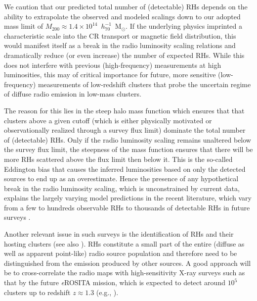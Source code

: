 \documentclass[useAMS,usenatbib]{mn2e}
\begin{document}
We caution that our predicted total number of (detectable) RHs depends on the
ability to extrapolate the observed and modeled scalings down to our adopted
mass limit of $M_{200}\approx1.4\times10^{14}$~$h_{70}^{-1}$~M$_{\odot}$. If the
underlying physics imprinted a characteristic scale into the CR transport or
magnetic field distribution, this would manifest itself as a break in the radio
luminosity scaling relations and dramatically reduce (or even increase) the
number of expected RHs.  While this does not interfere with previous
(high-frequency) measurements at high luminosities, this may of critical
importance for future, more sensitive (low-frequency) measurements of
low-redshift clusters that probe the uncertain regime of diffuse radio emission
in low-mass clusters.

The reason for this lies in the steep halo mass function which ensures that that
clusters above a given cutoff (which is either physically motivated or
observationally realized through a survey flux limit) dominate the total number
of (detectable) RHs. Only if the radio luminosity scaling remains unaltered
below the survey flux limit, the steepness of the mass function ensures that
there will be more RHs scattered above the flux limit then below it. This is the
so-called Eddington bias that causes the inferred luminosities based on only the
detected sources to end up as an overestimate. Hence the presence of any
hypothetical break in the radio luminosity scaling, which is unconstrained by
current data, explains the largely varying model predictions in the recent
literature, which vary from a few to hundreds observable RHs
\citep{2010A&A...509A..68C,2012arXiv1210.1020C,2011arXiv1110.2786S} to thousands 
of detectable RHs in future surveys \citep{2002A&A...396...83E}. 

Another relevant issue in such surveys is the identification of RHs and their
hosting clusters (see also \citealp{2010A&A...509A..68C}). RHs constitute a
small part of the entire (diffuse as well as apparent point-like) radio source
population and therefore need to be distinguished from the emission produced by
other sources. A good approach will be to cross-correlate the radio maps with
high-sensitivity X-ray surveys such as that by the future \emph{e}ROSITA mission, which
is expected to detect around $10^{5}$ clusters up to redshift $z \approx 1.3$
(e.g., \citealp{2011MSAIS..17..159C}).
\end{document}
